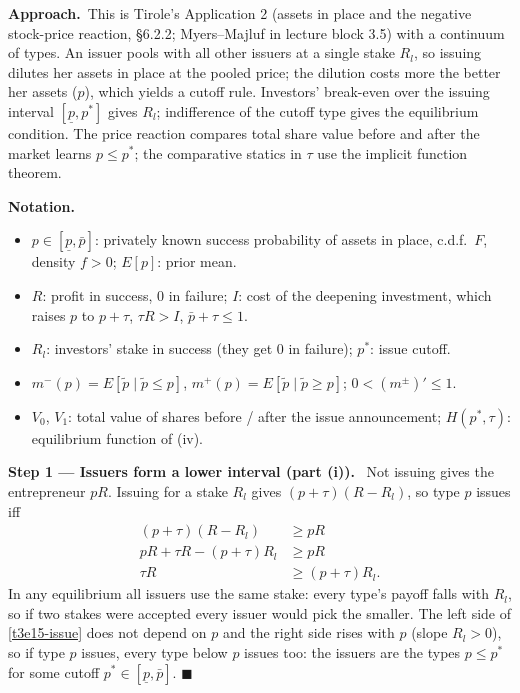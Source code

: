 \documentclass[11pt,a4paper]{article}
\newcommand{\notation}{\par\noindent\textbf{Notation.}}
\newcommand{\step}[2]{\par\medskip\noindent\textbf{Step #1 --- #2.}~}
\newcommand{\approach}{\par\smallskip\noindent\textbf{Approach.}~}
\begin{document}
\approach This is Tirole's Application 2 (assets in place and the negative stock-price reaction, \S6.2.2; Myers--Majluf in lecture block 3.5) with a continuum of types. An issuer pools with all other issuers at a single stake $R_l$, so issuing dilutes her assets in place at the pooled price; the dilution costs more the better her assets ($p$), which yields a cutoff rule. Investors' break-even over the issuing interval $[\underline p,p^*]$ gives $R_l$; indifference of the cutoff type gives the equilibrium condition. The price reaction compares total share value before and after the market learns $p\le p^*$; the comparative statics in $\tau$ use the implicit function theorem.

\notation
\begin{itemize}
  \item $p\in[\underline p,\bar p]$: privately known success probability of assets in place, c.d.f.\ $F$, density $f>0$; $E[p]$: prior mean.
  \item $R$: profit in success, 0 in failure; $I$: cost of the deepening investment, which raises $p$ to $p+\tau$, $\tau R>I$, $\bar p+\tau\le1$.
  \item $R_l$: investors' stake in success (they get 0 in failure); $p^*$: issue cutoff.
  \item $m^-(p)=E[\tilde p\mid\tilde p\le p]$, $m^+(p)=E[\tilde p\mid\tilde p\ge p]$; $0<(m^\pm)'\le1$.
  \item $V_0$, $V_1$: total value of shares before / after the issue announcement; $H(p^*,\tau)$: equilibrium function of (iv).
\end{itemize}

\step{1}{Issuers form a lower interval (part (i))} Not issuing gives the entrepreneur $pR$. Issuing for a
stake $R_l$ gives $(p+\tau)(R-R_l)$, so type $p$ issues iff
\begin{align}
  (p+\tau)(R-R_l) &\ge pR \nonumber\\
  pR+\tau R-(p+\tau)R_l &\ge pR \nonumber\\
  \tau R &\ge (p+\tau)R_l. \label{t3e15-issue}
\end{align}
In any equilibrium all issuers use the same stake: every type's payoff falls with $R_l$, so if two stakes
were accepted every issuer would pick the smaller. The left side of \eqref{t3e15-issue} does not depend on $p$ and the right side rises with $p$ (slope $R_l>0$),
so if type $p$ issues, every type below $p$ issues too: the issuers are the types $p\le p^*$ for some cutoff $p^*\in[\underline p,\bar p]$. $\blacksquare$
\end{document}
